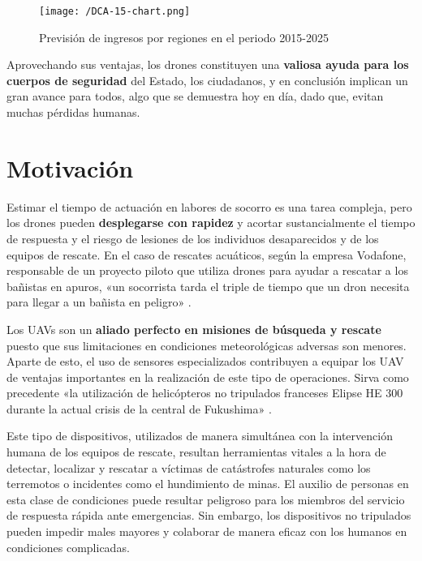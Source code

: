 \begin{figure}[!h]
\begin{center}
\texttt{[image: /DCA-15-chart.png]}
\caption[Previsión de ingresos por regiones en el periodo 2015-2025]{Previsión de ingresos por regiones en el periodo 2015-2025 \cite{cuotamercado}}
\label{fig:previsioningresos}
\end{center}
\end{figure}

Aprovechando sus ventajas, los drones constituyen una \textbf{valiosa ayuda para los cuerpos de seguridad} del Estado, los ciudadanos, y en conclusión implican un gran avance para todos, algo que se demuestra hoy en día, dado que, evitan muchas pérdidas humanas.

\section{Motivación}
\label{sec:motivacion}

Estimar el tiempo de actuación en labores de socorro es una tarea compleja, pero los drones pueden \textbf{desplegarse con rapidez} y acortar sustancialmente el tiempo de respuesta y el riesgo de lesiones de los individuos desaparecidos y de los equipos de rescate. En el caso de rescates acuáticos, según la empresa Vodafone, responsable de un proyecto piloto que utiliza drones para ayudar a rescatar a los bañistas en apuros, «un socorrista tarda el triple de tiempo que un dron necesita para llegar a un bañista en peligro» \cite{tiempomenor}.

Los \acs{UAV}s son un \textbf{aliado perfecto en misiones de búsqueda y rescate} puesto que sus limitaciones en condiciones meteorológicas adversas son menores. Aparte de esto, el uso de sensores especializados contribuyen a equipar los \acs{UAV} de ventajas importantes en la realización de este tipo de operaciones. Sirva como precedente «la utilización de helicópteros no tripulados franceses Elipse HE 300 durante la actual crisis de la central de Fukushima» \cite{notripulados}.

Este tipo de dispositivos, utilizados de manera simultánea con la intervención humana de los equipos de rescate, resultan herramientas vitales a la hora de detectar, localizar y rescatar a víctimas de catástrofes naturales como los terremotos o incidentes como el hundimiento de minas. El auxilio de personas en esta clase de condiciones puede resultar peligroso para los miembros del servicio de respuesta rápida ante emergencias. Sin embargo, los dispositivos no tripulados pueden impedir males mayores y colaborar de manera eficaz con los humanos en condiciones complicadas.


